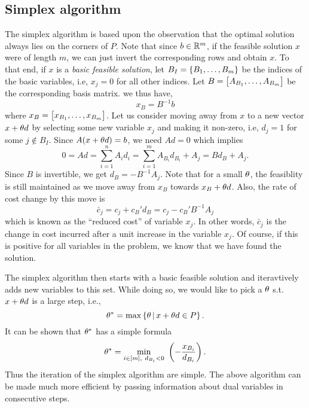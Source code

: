 \documentclass[letterpaper, 10pt, twocolumn, reqno]{amsart}
\begin{document}
\subsection{Simplex algorithm}
\label{ssec:simplex}
The simplex algorithm is based upon the observation that the optimal solution always lies on the corners of $P$. Note that since $b \in \mathbb{R}^m$, if the feasible solution $x$ were of length $m$, we can just invert the corresponding rows and obtain $x$. To that end, if $x$ is a \emph{basic feasible solution}, let $B_I = \left\{B_1, \ldots, B_m\right\}$ be the indices of the basic variables, i.e, $x_j = 0$ for all other indices. Let $B = \begin{bmatrix}A_{B_1}, \ldots, A_{B_m}\end{bmatrix}$ be the corresponding basis matrix. we thus have,
$$
x_B = B^{-1} b
$$
where $x_B = \begin{bmatrix}x_{B_1}, \ldots, x_{B_m}\end{bmatrix}$.
Let us consider moving away from $x$ to a new vector $x + \theta d$ by selecting some new variable $x_j$ and making it non-zero, i.e, $d_j = 1$ for some $j \notin B_I$. Since $A(x+\theta d) = b$, we need $A d = 0$ which implies
$$
0 = A d = \sum_{i=1}^n A_i d_i = \sum_{i=1}^m A_{B_i} d_{B_i} + A_j = B d_B + A_j.
$$
Since $B$ is invertible, we get $d_B = -B^{-1} A_j$. Note that for a small $\theta$, the feasiblity is still maintained as we move away from $x_B$ towards $x_B + \theta d$. Also, the rate of cost change by this move is
$$\bar{c}_j = c_j + c_B' d_B = c_j - c_B' B^{-1} A_j$$
which is known as the ``reduced cost'' of variable $x_j$. In other words, $\bar{c}_j$ is the change in cost incurred after a unit increase in the variable $x_j$. Of course, if this is positive for all variables in the problem, we know that we have found the solution.

The simplex algorithm then starts with a basic feasible solution and iteravtively adds new variables to this set. While doing so, we would like to pick a $\theta$ s.t. $x+\theta d$ is a large step, i.e.,
$$
\theta^* = \max \left\{\theta \, \vert \, x + \theta d \in P\right\}.
$$
It can be shown that $\theta^*$ has a simple formula
$$
\th^* = \min_{i \in [m],\ d_{B_i} < 0}\ \rbrac{- \f{x_{B_i}}{d_{B_i}}}.
$$
Thus the iteration of the simplex algorithm are simple.
The above algorithm can be made much more efficient by passing information about dual variables in consecutive steps.
\end{document}
